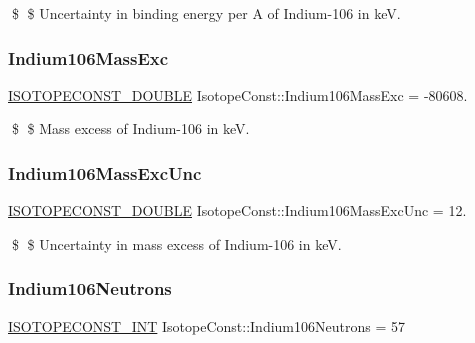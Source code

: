 \$ \$ Uncertainty in binding energy per A of Indium-\/106 in keV. \mbox{\label{group___isotope_const-_indium-_in106_gab83465f7fad4021da8d06c48fea52d43}} 
\subsubsection{\texorpdfstring{Indium106\+Mass\+Exc}{Indium106MassExc}}
{\footnotesize\ttfamily \mbox{\hyperlink{group___isotope_const-_macros_ga8f45a7272ce02c0b4c65c44636ed719a}{I\+S\+O\+T\+O\+P\+E\+C\+O\+N\+S\+T\+\_\+\+D\+O\+U\+B\+LE}} Isotope\+Const\+::\+Indium106\+Mass\+Exc = -\/80608.}

\$ \$ Mass excess of Indium-\/106 in keV. \mbox{\label{group___isotope_const-_indium-_in106_gafd0e52ada5ad3503f377528aab8b0d94}} 
\subsubsection{\texorpdfstring{Indium106\+Mass\+Exc\+Unc}{Indium106MassExcUnc}}
{\footnotesize\ttfamily \mbox{\hyperlink{group___isotope_const-_macros_ga8f45a7272ce02c0b4c65c44636ed719a}{I\+S\+O\+T\+O\+P\+E\+C\+O\+N\+S\+T\+\_\+\+D\+O\+U\+B\+LE}} Isotope\+Const\+::\+Indium106\+Mass\+Exc\+Unc = 12.}

\$ \$ Uncertainty in mass excess of Indium-\/106 in keV. \mbox{\label{group___isotope_const-_indium-_in106_gac5c294af79775bce95463f60a0b04fb5}} 
\subsubsection{\texorpdfstring{Indium106\+Neutrons}{Indium106Neutrons}}
{\footnotesize\ttfamily \mbox{\hyperlink{group___isotope_const-_macros_ga5f18360b3e99483a35c32d789e62621c}{I\+S\+O\+T\+O\+P\+E\+C\+O\+N\+S\+T\+\_\+\+I\+NT}} Isotope\+Const\+::\+Indium106\+Neutrons = 57}

